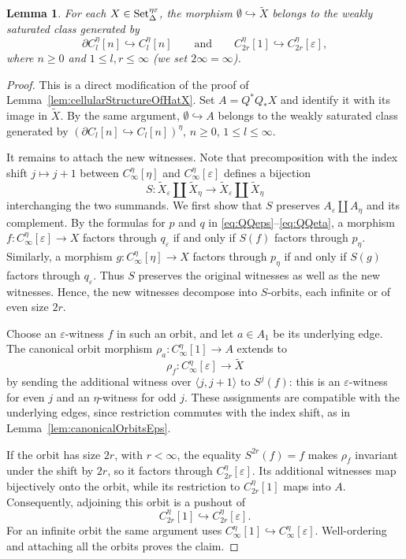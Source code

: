\documentclass{article}
\theoremstyle{plain}
\newtheorem{lemma}[theorem]{Lemma}
\theoremstyle{definition}
\theoremstyle{remark}
\begin{document}
\begin{lemma}\label{lem:etaCellStructure}
For each $X\in\mathrm{Set}^{\eta\varepsilon}_\Delta$, the morphism
$\emptyset\hookrightarrow\widetilde X$ belongs to the weakly saturated
class generated by
\[
\partial C^\eta_l[n]\hookrightarrow C^\eta_l[n]
\qquad\text{and}\qquad
C^\eta_{2r}[1]\hookrightarrow C^\eta_{2r}[\varepsilon],
\]
where $n\geq0$ and $1\leq l,r\leq\infty$ (we set $2\infty=\infty$).
\end{lemma}
\begin{proof}
    This is a direct modification of the proof of
Lemma~\ref{lem:cellularStructureOfHatX}. Set $A=Q^*Q_*X$ and identify it with its image in
$\widetilde X$. By the same argument,
$\emptyset\hookrightarrow A$ belongs to the weakly saturated class
generated by $(\partial C_l[n]\hookrightarrow C_l[n])^\eta$,
$n\geq0$, $1\leq l\leq\infty$.

It remains to attach the new witnesses.
Note that precomposition with the index shift $j\mapsto j+1$
between $C^\eta_\infty[\eta]$ and
$C^\eta_\infty[\varepsilon]$ defines a bijection
\[
    S\colon
    \widetilde X_\varepsilon\amalg\widetilde X_\eta
    \longrightarrow
    \widetilde X_\varepsilon\amalg\widetilde X_\eta
\]
interchanging the two summands.
We first show that $S$ preserves
$A_\varepsilon\amalg A_\eta$ and its complement.
By the formulas for $p$ and $q$ in
\eqref{eq:QQeps}--\eqref{eq:QQeta},
a morphism $f\colon C^\eta_\infty[\varepsilon]\to X$
factors through $q_\varepsilon$ if and only if
$S(f)$ factors through $p_\eta$.
Similarly, a morphism
$g\colon C^\eta_\infty[\eta]\to X$
factors through $p_\eta$ if and only if
$S(g)$ factors through $q_\varepsilon$.
Thus $S$ preserves the original witnesses as well as the new witnesses.
Hence, the new witnesses decompose into $S$-orbits,
each infinite or of even size $2r$.

Choose an $\varepsilon$-witness $f$ in such an orbit,
and let $a\in A_1$ be its underlying edge.
The canonical orbit morphism
$\rho_a\colon C^\eta_\infty[1]\to A$
extends to
\[
    \rho_f\colon
    C^\eta_\infty[\varepsilon]\longrightarrow\widetilde X
\]
by sending the additional witness over
$\langle j,j+1\rangle$ to $S^j(f)$:
this is an $\varepsilon$-witness for even $j$ and
an $\eta$-witness for odd $j$.
These assignments are compatible with the underlying
edges, since restriction commutes with the index shift,
as in Lemma~\ref{lem:canonicalOrbitsEps}.

If the orbit has size $2r$, with $r<\infty$, the equality $S^{2r}(f)=f$
makes $\rho_f$ invariant under the shift by $2r$,
so it factors through $C^\eta_{2r}[\varepsilon]$.
Its additional witnesses map bijectively onto the orbit,
while its restriction to $C^\eta_{2r}[1]$ maps into $A$.
Consequently, adjoining this orbit is a pushout of
\[
    C^\eta_{2r}[1]\hookrightarrow C^\eta_{2r}[\varepsilon].
\]
For an infinite orbit the same argument uses
$C^\eta_\infty[1]\hookrightarrow C^\eta_\infty[\varepsilon]$.
Well-ordering and attaching all the orbits proves the claim.
\end{proof}
\end{document}
